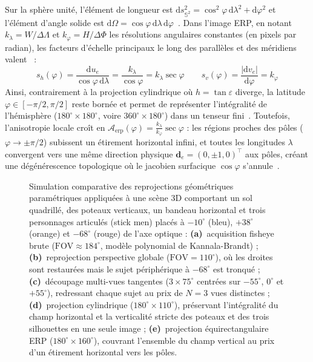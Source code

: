 \documentclass[11pt,a4paper]{article}
\renewcommand{\emph}[1]{\textup{#1}}
\begin{document}
Sur la sphère unité, l'élément de longueur est $\mathrm{d}s_{\mathbb{S}^2}^2 = \cos^2\varphi\,\mathrm{d}\lambda^2 + \mathrm{d}\varphi^2$ et l'élément d'angle solide est  $\mathrm{d}\Omega = \cos\varphi\,\mathrm{d}\lambda\,\mathrm{d}\varphi$~\cite{snyder1987}. Dans l'image ERP, en notant $k_\lambda = W/\Delta\Lambda$ et $k_\varphi = H/\Delta\Phi$ les résolutions angulaires constantes (en pixels par radian), les facteurs d'échelle principaux le long des parallèles et des méridiens valent~\cite{snyder1987,su2017spherical} :
\begin{equation}
  s_h(\varphi) = \frac{\mathrm{d}u_e}{\cos\varphi\,\mathrm{d}\lambda} = \frac{k_\lambda}{\cos\varphi} = k_\lambda\sec\varphi \qquad
  s_v(\varphi) = \frac{|\mathrm{d}v_e|}{\mathrm{d}\varphi} = k_\varphi
\end{equation}
Ainsi, contrairement à la projection cylindrique où $h = \tan\varepsilon$ diverge, la latitude $\varphi \in [-\pi/2, \pi/2]$ reste bornée et permet de représenter l'intégralité de l'hémisphère ($180^\circ \times 180^\circ$, voire $360^\circ \times 180^\circ$) dans un tenseur fini~\cite{coors2018spherenet}. Toutefois, l'anisotropie locale croît en $\mathcal{A}_{\text{erp}}(\varphi) = \frac{k_\lambda}{k_\varphi}\sec\varphi$ : les régions proches des pôles ($\varphi \to \pm\pi/2$) subissent un étirement horizontal infini, et toutes les longitudes $\lambda$ convergent vers une même direction physique $\mathbf{d}_e = (0, \pm 1, 0)^\top$ aux pôles, créant une dégénérescence topologique où le jacobien surfacique $\cos\varphi$ s'annule~\cite{snyder1987,su2017spherical}.


\begin{figure}[H]
  \centering
  
  \caption{Simulation comparative des reprojections géométriques paramétriques appliquées à une scène 3D comportant un sol quadrillé, des poteaux verticaux, un bandeau horizontal et trois personnages articulés (\emph{stick men}) placés à $-10^\circ$ (bleu), $+38^\circ$ (orange) et $-68^\circ$ (rouge) de l'axe optique : \textbf{(a)}~acquisition fisheye brute ($\text{FOV} \approx 184^\circ$, modèle polynomial de Kannala-Brandt) ; \textbf{(b)}~reprojection perspective globale ($\text{FOV} = 110^\circ$), où les droites sont restaurées mais le sujet périphérique à $-68^\circ$ est tronqué ; \textbf{(c)}~découpage multi-vues tangentes ($3 \times 75^\circ$ centrées sur $-55^\circ$, $0^\circ$ et $+55^\circ$), redressant chaque sujet au prix de $N = 3$ vues distinctes ; \textbf{(d)}~projection cylindrique ($180^\circ \times 110^\circ$), préservant l'intégralité du champ horizontal et la verticalité stricte des poteaux et des trois silhouettes en une seule image ; \textbf{(e)}~projection équirectangulaire ERP ($180^\circ \times 160^\circ$), couvrant l'ensemble du champ vertical au prix d'un étirement horizontal vers les pôles.}
  \label{fig:comparaison-pretraitements}
\end{figure}
\end{document}
